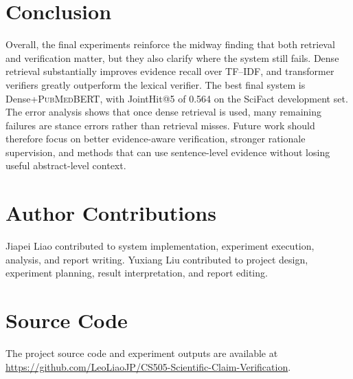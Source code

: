 \documentclass[11pt]{article}
\begin{document}
\section{Conclusion}
Overall, the final experiments reinforce the midway finding that both retrieval and verification matter, but they also clarify where the system still fails. Dense retrieval substantially improves evidence recall over TF--IDF, and transformer verifiers greatly outperform the lexical verifier. The best final system is Dense+\textsc{PubMedBERT}, with JointHit@5 of 0.564 on the SciFact development set. The error analysis shows that once dense retrieval is used, many remaining failures are stance errors rather than retrieval misses. Future work should therefore focus on better evidence-aware verification, stronger rationale supervision, and methods that can use sentence-level evidence without losing useful abstract-level context.

\section*{Author Contributions}
Jiapei Liao contributed to system implementation, experiment execution, analysis, and report writing. Yuxiang Liu contributed to project design, experiment planning, result interpretation, and report editing.

\section*{Source Code}
The project source code and experiment outputs are available at \url{https://github.com/LeoLiaoJP/CS505-Scientific-Claim-Verification}.
\end{document}
